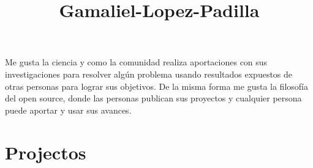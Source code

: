 \documentclass[a3paper]{adcv_color}
\title{Gamaliel-Lopez-Padilla}
\begin{document}
\changefontsizes{16pt}

\begin{flushleft}
	Me gusta la ciencia y como la comunidad realiza  aportaciones con sus investigaciones para resolver algún problema usando resultados expuestos de otras personas para lograr sus objetivos. De la misma forma me gusta la filosofía del open source, donde las personas publican sus proyectos y cualquier persona puede aportar y usar sus avances.\\
\end{flushleft}

\section{Projectos}\\
\end{document}
